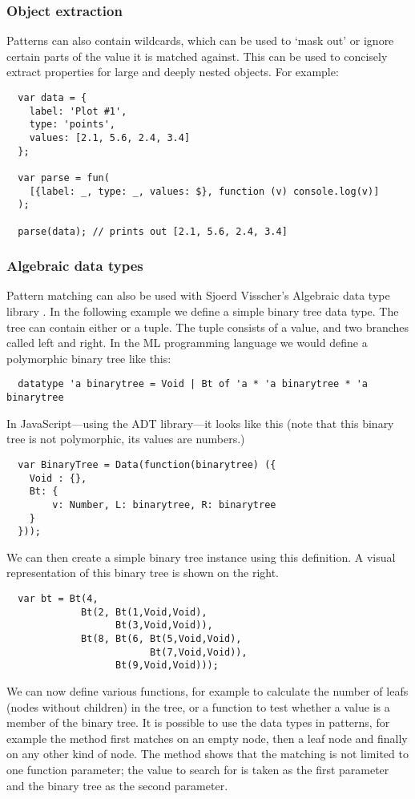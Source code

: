 \subsubsection{Object extraction}
Patterns can also contain wildcards, which can be used to ‘mask out’ or ignore certain parts of the value it is matched against. This can be used to concisely extract properties for large and deeply nested objects. For example:
\begin{verbatim}
  var data = {
    label: 'Plot #1',
    type: 'points',
    values: [2.1, 5.6, 2.4, 3.4]
  };

  var parse = fun(
    [{label: _, type: _, values: $}, function (v) console.log(v)]
  );

  parse(data); // prints out [2.1, 5.6, 2.4, 3.4]
\end{verbatim}
\subsubsection{Algebraic data types}
Pattern matching can also be used with Sjoerd Visscher's Algebraic data type library \cite{visser08}. In the following example we define a simple binary tree data type. The tree can contain either  or a  tuple. The tuple consists of a value, and two branches called left and right. In the ML programming language we would define a polymorphic binary tree like this:
\begin{verbatim}
  datatype 'a binarytree = Void | Bt of 'a * 'a binarytree * 'a binarytree
\end{verbatim}
In JavaScript---using the ADT library---it looks like this (note that this binary tree is not polymorphic, its values are numbers.)
\begin{verbatim}
  var BinaryTree = Data(function(binarytree) ({
    Void : {},
    Bt: {
        v: Number, L: binarytree, R: binarytree
    }
  }));
\end{verbatim}
We can then create a simple binary tree instance using this definition. A visual representation of this binary tree is shown on the right.
\begin{verbatim}
  var bt = Bt(4, 
             Bt(2, Bt(1,Void,Void), 
                   Bt(3,Void,Void)), 
             Bt(8, Bt(6, Bt(5,Void,Void), 
                         Bt(7,Void,Void)), 
                   Bt(9,Void,Void)));
\end{verbatim}
We can now define various functions, for example to calculate the number of leafs (nodes without children) in the tree, or a function to test whether a value is a member of the binary tree. It is possible to use the data types in patterns, for example the  method first matches on an empty node, then a leaf node and finally on any other kind of node. The  method shows that the matching is not limited to one function parameter; the value to search for is taken as the first parameter and the binary tree as the second parameter.
